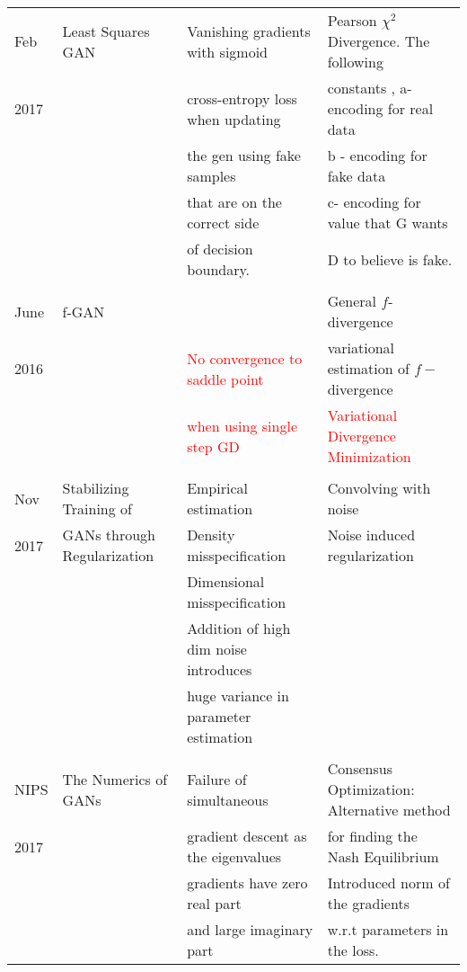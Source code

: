 \begin{adjustbox}{max width = 9cm}
\begin{tabular}{|l|l|l|l|}
Feb & Least Squares GAN \cite{lsgan}& Vanishing gradients with sigmoid & Pearson $\chi^2$ Divergence. The following  \\
2017&&cross-entropy loss when updating & constants , a- encoding for real data\\
&&the gen using fake samples&b - encoding for fake data \\
&&that are on the correct side & c- encoding for value that G wants\\
&&of decision boundary.& D to believe is fake.\\
&&&\\
June & f-GAN\cite{fgan}&   & General $f$-divergence \\
2016&&\textcolor{red}{No convergence to saddle point} & variational estimation of $f-$ divergence \\
&&\textcolor{red}{when using single step GD} & \textcolor{red}{Variational Divergence Minimization}\\
&&& \\
Nov & Stabilizing Training of\cite{fgan_2} & Empirical estimation& Convolving with noise \\
2017 &  GANs through Regularization & Density misspecification& Noise induced regularization \\
&&Dimensional misspecification &\\
&&Addition of high dim noise introduces &\\
&&huge variance in parameter estimation&\\
&&&\\
NIPS& The Numerics of GANs \cite{geiger06} & Failure of simultaneous  &
Consensus Optimization: Alternative method  \\
 2017 & &gradient descent as the eigenvalues &  for finding the Nash Equilibrium\\
 &&gradients have zero real part &Introduced norm of the gradients\\
 &&and large imaginary part&w.r.t parameters in the loss.\\
 


\end{tabular}
\end{adjustbox}
